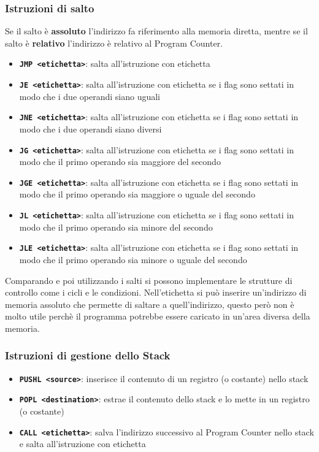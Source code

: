 \documentclass[a4paper]{article}
\theoremstyle{break}
\theoremstyle{break}
\theoremstyle{break}
\theoremstyle{break}
\begin{document}
\subsubsection{Istruzioni di salto}
Se il salto è \textbf{assoluto} l'indirizzo fa riferimento alla memoria diretta, mentre se il salto è
\textbf{relativo} l'indirizzo è relativo al Program Counter.
\begin{itemize}
	\item \textbf{\texttt{JMP <etichetta>}}: salta all'istruzione con etichetta
	\item \textbf{\texttt{JE <etichetta>}}: salta all'istruzione con etichetta se i flag sono settati in modo che i due operandi siano uguali
	\item \textbf{\texttt{JNE <etichetta>}}: salta all'istruzione con etichetta se i flag sono settati in modo che i due operandi siano diversi
	\item \textbf{\texttt{JG <etichetta>}}: salta all'istruzione con etichetta se i flag sono settati in modo che il primo operando sia maggiore del secondo
	\item \textbf{\texttt{JGE <etichetta>}}: salta all'istruzione con etichetta se i flag sono settati in modo che il primo operando sia maggiore o uguale del secondo
	\item \textbf{\texttt{JL <etichetta>}}: salta all'istruzione con etichetta se i flag sono settati in modo che il primo operando sia minore del secondo
	\item \textbf{\texttt{JLE <etichetta>}}: salta all'istruzione con etichetta se i flag sono settati in modo che il primo operando sia minore o uguale del secondo
\end{itemize}
Comparando e poi utilizzando i salti si possono implementare le strutture di controllo come i cicli e le condizioni.
Nell'etichetta si può inserire un'indirizzo di memoria assoluto che permette di saltare a quell'indirizzo,
questo però non è molto utile perchè il programma potrebbe essere caricato in un'area diversa della memoria.

\subsubsection{Istruzioni di gestione dello Stack}
\begin{itemize}
	\item \textbf{\texttt{PUSHL <source>}}: inserisce il contenuto di un registro (o costante) nello stack
	\item \textbf{\texttt{POPL <destination>}}: estrae il contenuto dello stack e lo mette in un registro (o costante)
	\item \textbf{\texttt{CALL <etichetta>}}: salva l'indirizzo successivo al Program Counter nello stack e salta all'istruzione con etichetta
\end{itemize}
\end{document}
